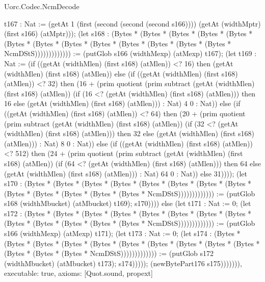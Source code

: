 \begin{lexlean}{Uorc.Codec.NcmDecode}
\begin{semanticmodule}
{t167 : Nat := (getAt 1 (first (second (second (second s166)))) (getAt (widthMptr) (first s166) (atMptr))); (let s168 : (Bytes * (Bytes * (Bytes * (Bytes * (Bytes * (Bytes * (Bytes * (Bytes * (Bytes * (Bytes * (Bytes * (Bytes * (Bytes * NcmDStS))))))))))))) := (putGlob s166 (widthMexp) (atMexp) t167); (let t169 : Nat := (if ((getAt (widthMlen) (first s168) (atMlen)) <? 16) then (getAt (widthMlen) (first s168) (atMlen)) else (if ((getAt (widthMlen) (first s168) (atMlen)) <? 32) then (16 + (prim quotient (prim subtract (getAt (widthMlen) (first s168) (atMlen)) (if (16 <? (getAt (widthMlen) (first s168) (atMlen))) then 16 else (getAt (widthMlen) (first s168) (atMlen))) : Nat) 4 0 : Nat)) else (if ((getAt (widthMlen) (first s168) (atMlen)) <? 64) then (20 + (prim quotient (prim subtract (getAt (widthMlen) (first s168) (atMlen)) (if (32 <? (getAt (widthMlen) (first s168) (atMlen))) then 32 else (getAt (widthMlen) (first s168) (atMlen))) : Nat) 8 0 : Nat)) else (if ((getAt (widthMlen) (first s168) (atMlen)) <? 512) then (24 + (prim quotient (prim subtract (getAt (widthMlen) (first s168) (atMlen)) (if (64 <? (getAt (widthMlen) (first s168) (atMlen))) then 64 else (getAt (widthMlen) (first s168) (atMlen))) : Nat) 64 0 : Nat)) else 31)))); (let s170 : (Bytes * (Bytes * (Bytes * (Bytes * (Bytes * (Bytes * (Bytes * (Bytes * (Bytes * (Bytes * (Bytes * (Bytes * (Bytes * NcmDStS))))))))))))) := (putGlob s168 (widthMbucket) (atMbucket) t169); s170)))) else (let t171 : Nat := 0; (let s172 : (Bytes * (Bytes * (Bytes * (Bytes * (Bytes * (Bytes * (Bytes * (Bytes * (Bytes * (Bytes * (Bytes * (Bytes * (Bytes * NcmDStS))))))))))))) := (putGlob s166 (widthMexp) (atMexp) t171); (let t173 : Nat := 0; (let s174 : (Bytes * (Bytes * (Bytes * (Bytes * (Bytes * (Bytes * (Bytes * (Bytes * (Bytes * (Bytes * (Bytes * (Bytes * (Bytes * NcmDStS))))))))))))) := (putGlob s172 (widthMbucket) (atMbucket) t173); s174))))); (newBytePart176 s175))))))),
  executable: true,
  axioms: [Quot.sound, propext]
}


\end{semanticmodule}
\end{lexlean}
